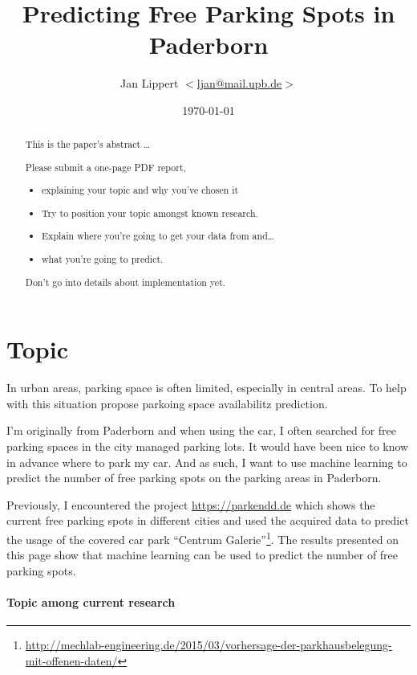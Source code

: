 \documentclass[journal,10pt]{IEEEtran}
\title{Predicting Free Parking Spots in Paderborn}
\author{Jan Lippert \(<\)\href{mailt:ljan@mail.upb.de}{ljan@mail.upb.de}\(>\)}
\date{\today}
\begin{document}
\maketitle

\begin{abstract}
This is the paper's abstract \ldots

Please submit a one-page PDF report, 

\begin{itemize}
  \item explaining your topic and why you've chosen it
  \item Try to position your topic amongst known research.
  \item Explain where you're going to get your data from and\ldots
  \item what you're going to predict.
\end{itemize}

Don't go into details about implementation yet.
\end{abstract}

\section{Topic}

In urban areas, parking space is often limited, especially in central areas. To help with this situation  propose parkoing space availabilitz prediction. 


I'm originally from Paderborn and when using the car, I often searched for free parking spaces in the city managed parking lots. It would have been nice to know in advance where to park my car. And as such, I want to use machine learning to predict the number of free parking spots on the parking areas in Paderborn.

Previously, I encountered the project \url{https://parkendd.de} which shows the current free parking spots in different cities and used the acquired data to predict the usage of the covered car park ``Centrum Galerie''\footnote{\url{http://mechlab-engineering.de/2015/03/vorhersage-der-parkhausbelegung-mit-offenen-daten/}}. The results presented on this page show that machine learning can be used to predict the number of free parking spots.

\paragraph{Topic among current research}
\end{document}
